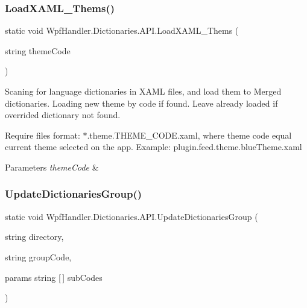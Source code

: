 \subsubsection{\texorpdfstring{Load\+X\+A\+M\+L\+\_\+\+Thems()}{LoadXAML\_Thems()}}
{\footnotesize\ttfamily static void Wpf\+Handler.\+Dictionaries.\+A\+P\+I.\+Load\+X\+A\+M\+L\+\_\+\+Thems (\begin{DoxyParamCaption}\item[{string}]{theme\+Code }\end{DoxyParamCaption})\hspace{0.3cm}{\ttfamily [static]}}



Scaning for language dictionaries in X\+A\+ML files, and load them to Merged dictionaries. Loading new theme by code if found. Leave already loaded if overrided dictionary not found. 

Require files format\+: $\ast$.theme.\+T\+H\+E\+M\+E\+\_\+\+C\+O\+D\+E.\+xaml, where theme code equal current theme selected on the app. Example\+: plugin.\+feed.\+theme.\+blue\+Theme.\+xaml 


\begin{DoxyParams}{Parameters}
{\em theme\+Code} & \\
\hline
\end{DoxyParams}
\mbox{\label{class_wpf_handler_1_1_dictionaries_1_1_a_p_i_a0de06b29ec542383dbdc470bb9a7c98e}} 
\subsubsection{\texorpdfstring{Update\+Dictionaries\+Group()}{UpdateDictionariesGroup()}}
{\footnotesize\ttfamily static void Wpf\+Handler.\+Dictionaries.\+A\+P\+I.\+Update\+Dictionaries\+Group (\begin{DoxyParamCaption}\item[{string}]{directory,  }\item[{string}]{group\+Code,  }\item[{params string \mbox{[}$\,$\mbox{]}}]{sub\+Codes }\end{DoxyParamCaption})\hspace{0.3cm}{\ttfamily [static]}}






